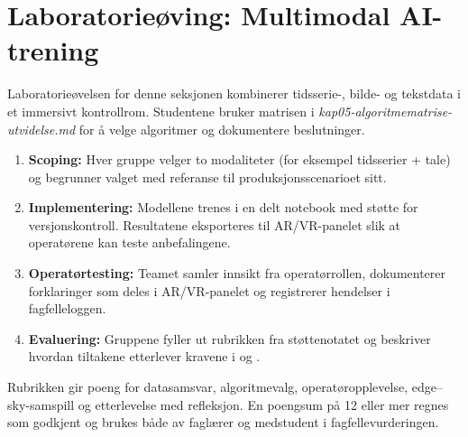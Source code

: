\section{Laboratorieøving: Multimodal AI-trening}
Laboratorieøvelsen for denne seksjonen kombinerer tidsserie-, bilde- og tekstdata i et immersivt kontrollrom. Studentene bruker matrisen i \textit{kap05-algoritmematrise-utvidelse.md} for å velge algoritmer og dokumentere beslutninger.

\begin{enumerate}
    \item \textbf{Scoping:} Hver gruppe velger to modaliteter (for eksempel tidsserier + tale) og begrunner valget med referanse til produksjonsscenarioet sitt.
    \item \textbf{Implementering:} Modellene trenes i en delt notebook med støtte for versjonskontroll. Resultatene eksporteres til AR/VR-panelet slik at operatørene kan teste anbefalingene.
    \item \textbf{Operatørtesting:} Teamet samler innsikt fra operatørrollen, dokumenterer forklaringer som deles i AR/VR-panelet og registrerer hendelser i fagfelleloggen.
    \item \textbf{Evaluering:} Gruppene fyller ut rubrikken fra støttenotatet og beskriver hvordan tiltakene etterlever kravene i \citet{iec62443-2-1} og \citet{eu2022nis2}.
\end{enumerate}

Rubrikken gir poeng for datasamsvar, algoritmevalg, operatøropplevelse, edge--sky-samspill og etterlevelse med refleksjon. En poengsum på 12 eller mer regnes som godkjent og brukes både av faglærer og medstudent i fagfellevurderingen.

